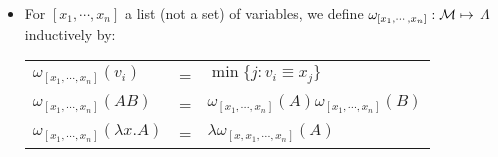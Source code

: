\documentclass[11pt]{article}
\newcommand \cM {\cal M}
\begin{document}
\begin{itemize}
	\item
	      For $[x_1,\cdots, x_n]$ a list (not a set) of variables, 
	      we define $\omega_{[x_1,\cdots, x_n]}: \cM \mapsto$ $\Lambda$ inductively by:
	      \begin{center}
	      	\begin{tabular}{lll}
	      		$\omega_{[x_1,\cdots, x_n]}(v_i)$          & = & $\min\{j:v_i \equiv x_j\}$                                   \\
	      		$\omega_{[x_1,\cdots, x_n]}(AB)  $         & = & $\omega_{[x_1,\cdots, x_n]}(A)\omega_{[x_1,\cdots, x_n]}(B)$ \\
	      		$\omega_{[x_1,\cdots, x_n]}(\lambda x.A) $ & = & $\lambda \omega_{[x,x_1,\cdots, x_n]}(A)$                    
	      	\end{tabular}
	      \end{center}
	      

\end{itemize}
\end{document}
